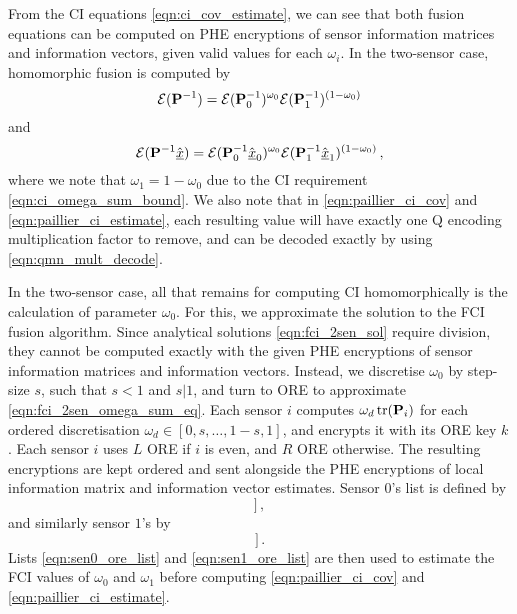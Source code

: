 \documentclass[letterpaper, 10 pt, conference]{ieeeconf}  %
\begin{document}
From the CI equations \eqref{eqn:ci_cov_estimate}, we can see that both fusion equations can be computed on PHE encryptions of sensor information matrices and information vectors, given valid values for each $\omega_i$. In the two-sensor case, homomorphic fusion is computed by
\begin{equation}
   \mathcal{E}({{\mathbf{P}}}^{-1}) = \mathcal{E}({{\mathbf{P}}}^{-1}_0)^{\omega_0}\mathcal{E}({{\mathbf{P}}}^{-1}_1)^{(1 -\omega_0)} \label{eqn:paillier_ci_cov}
\end{equation}
and
\begin{equation}
   \mathcal{E}({{\mathbf{P}}}^{-1}\hat{{\underline{x}}}) = \mathcal{E}({{\mathbf{P}}}^{-1}_0\hat{{\underline{x}}}_0)^{\omega_0}\mathcal{E}({{\mathbf{P}}}^{-1}_1\hat{{\underline{x}}}_1)^{(1 - \omega_0)}\,, \label{eqn:paillier_ci_estimate}
\end{equation}
where we note that $\omega_1=1-\omega_0$ due to the CI requirement \eqref{eqn:ci_omega_sum_bound}. We also note that in \eqref{eqn:paillier_ci_cov} and \eqref{eqn:paillier_ci_estimate}, each resulting value will have exactly one Q encoding multiplication factor to remove, and can be decoded exactly by using \eqref{eqn:qmn_mult_decode}.
   
In the two-sensor case, all that remains for computing CI homomorphically is the calculation of parameter $\omega_0$. For this, we approximate the solution to the FCI fusion algorithm. Since analytical solutions \eqref{eqn:fci_2sen_sol} require division, they cannot be computed exactly with the given PHE encryptions of sensor information matrices and information vectors. Instead, we discretise $\omega_0$ by step-size $s$, such that $s<1$ and $s|1$, and turn to ORE to approximate \eqref{eqn:fci_2sen_omega_sum_eq}. Each sensor $i$ computes $\omega_d\operatorname{tr}({{\mathbf{P}}}_i)$ for each ordered discretisation $\omega_d \in [0,s,\dots,1-s,1]$, and encrypts it with its ORE key $k$. Each sensor $i$ uses $L$ ORE if $i$ is even, and $R$ ORE otherwise. The resulting encryptions are kept ordered and sent alongside the PHE encryptions of local information matrix and information vector estimates. Sensor $0$'s list is defined by 
\begin{equation}
   [\mathcal{E}^L_{ORE}(\omega_d\tr(\mP_0)),\ \omega_d \in [0,s,\dots,1-s,1]]\,, \label{eqn:sen0_ore_list}
\end{equation}
and similarly sensor $1$'s by
\begin{equation}
   [\mathcal{E}^R_{ORE}(\omega_d\tr(\mP_1)),\ \omega_d \in [0,s,\dots,1-s,1]]\,. \label{eqn:sen1_ore_list}
\end{equation}
Lists \eqref{eqn:sen0_ore_list} and \eqref{eqn:sen1_ore_list} are then used to estimate the FCI values of $\omega_0$ and $\omega_1$ before computing \eqref{eqn:paillier_ci_cov} and \eqref{eqn:paillier_ci_estimate}.
\end{document}

